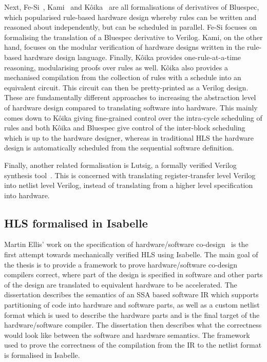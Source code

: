 Next, Fe-Si~\cite{braibant13_formal_verif_hardw_synth}, Kami~\cite{choi17_kami}
and Kôika~\cite[]{bourgeat20_essen_blues} are all formalisations of derivatives
of Bluespec, which popularised rule-based hardware design whereby rules can be
written and reasoned about independently, but can be scheduled in parallel.
Fe-Si focuses on formalising the translation of a Bluespec derivative to
Verilog.  Kami, on the other hand, focuses on the modular verification of
hardware designs written in the rule-based hardware design language.  Finally,
Kôika provides one-rule-at-a-time reasoning, modularising proofs over rules as
well.  Kôika also provides a mechanised compilation from the collection of rules
with a schedule into an equivalent circuit.  This circuit can then be
pretty-printed as a Verilog design.  These are fundamentally different
approaches to increasing the abstraction level of hardware design compared to
translating software into hardware.  This mainly comes down to Kôika giving
fine-grained control over the intra-cycle scheduling of rules and both Kôika and
Bluespec give control of the inter-block scheduling which is up to the hardware
designer, whereas in traditional \gls{HLS} the hardware design is automatically
scheduled from the sequential software definition.

Finally, another related formalisation is Lutsig, a formally verified Verilog
synthesis tool~\cite[]{lööw21_lutsig}.  This is concerned with translating
register-transfer level Verilog into netlist level Verilog, instead of
translating from a higher level specification into hardware.

\subsection{HLS formalised in Isabelle}

Martin Ellis' work on the specification of hardware/software
co-design~\cite{ellis08_csicgfu} is the first attempt towards mechanically
verified \gls{HLS} using Isabelle.  The main goal of the thesis is to provide a
framework to prove hardware/software co-design compilers correct, where part of
the design is specified in software and other parts of the design are translated
to equivalent hardware to be accelerated.  The dissertation describes the
semantics of an \gls{SSA} based software \gls{IR} which supports partitioning of
code into hardware and software parts, as well as a custom netlist format which
is used to describe the hardware parts and is the final target of the
hardware/software compiler.  The dissertation then describes what the
correctness would look like between the software and hardware semantics. The
framework used to prove the correctness of the compilation from the IR to the
netlist format is formalised in Isabelle.

